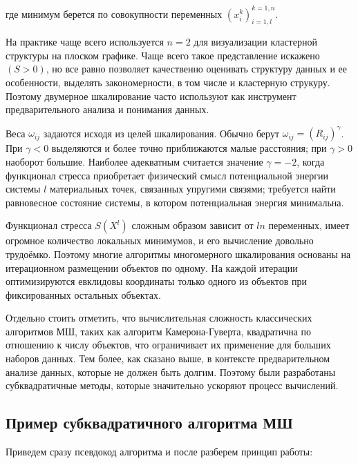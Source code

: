 где минимум берется по совокупности переменных $(x_i^k)_{i=1,l}^{k=1,n}$.

На практике чаще всего используется $n=2$ для визуализации кластерной структуры на плоском графике. Чаще всего такое представление искажено $(S > 0)$, но все равно позволяет качественно оценивать структуру данных и ее особенности, выделять закономерности, в том числе и кластерную струкуру. Поэтому двумерное шкалирование часто используют как	инструмент предварительного анализа и понимания данных. 

Веса $\omega_{ij}$ задаются исходя из целей шкалирования. Обычно берут $\omega_{ij} = (R_{ij} )^\gamma$.	При $\gamma < 0$ выделяются и более точно приближаются малые расстояния;	при $\gamma > 0$ наоборот большие. Наиболее адекватным считается значение $\gamma = -2$,
когда функционал стресса приобретает физический смысл потенциальной энергии	системы $l$ материальных точек, связанных упругими связями; требуется найти равновесное состояние системы, в котором потенциальная энергия минимальна.

Функционал стресса $S(X^l)$ сложным образом зависит от $ln$ переменных, имеет огромное количество локальных минимумов, и его вычисление довольно трудоёмко.	Поэтому многие алгоритмы многомерного шкалирования основаны на итерационном	размещении объектов по одному. На каждой итерации оптимизируются евклидовы координаты только одного из объектов при фиксированных остальных объектах.

Отдельно стоить отметить, что вычислительная сложность классических алгоритмов МШ, таких как алгоритм Камерона-Гуверта, квадратична по отношению к числу объектов, что ограничивает их применение для больших наборов данных. Тем более, как сказано выше, в контексте предварительном анализе данных, которые не должен быть долгим. Поэтому были разработаны субквадратичные методы, которые значительно ускоряют процесс вычислений.

\subsection*{Пример субквадратичного алгоритма МШ}

Приведем сразу псевдокод алгоритма и после разберем принцип работы:


